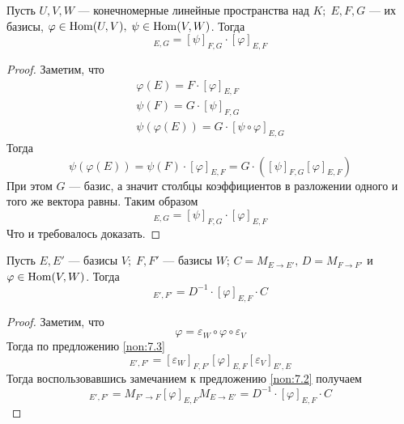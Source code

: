 \documentclass[../main.tex]{subfiles}
\begin{document}
\begin{theorem-non}
\label{non:7.3}
  Пусть $U, V, W$ --- конечномерные линейные пространства над $K;\; E, F, G$ --- их базисы, $\varphi \in \operatorname{Hom}(U, V),\; \psi \in \operatorname{Hom}(V, W)$. Тогда
  \begin{equation*}
    [\psi \circ \varphi]_{E, G} = [\psi]_{F, G} \cdot [\varphi]_{E, F}
  \end{equation*}
\end{theorem-non}
\begin{proof}
  Заметим, что
  \begin{equation*}
    \begin{gathered}
      \varphi(E) = F \cdot [\varphi]_{E, F} \\
      \psi(F) = G \cdot [\psi]_{F, G} \\
      \psi(\varphi(E)) = G \cdot [\psi \circ \varphi]_{E, G}
    \end{gathered}
  \end{equation*}
  Тогда
  \begin{equation*}
    \psi(\varphi(E)) = \psi(F) \cdot [\varphi]_{E, F} = G \cdot ([\psi]_{F, G}[\varphi]_{E, F})
  \end{equation*}
  При этом $G$ --- базис, а значит столбцы коэффициентов в разложении одного и того же вектора равны. Таким образом
  \begin{equation*}
    [\psi \circ \varphi]_{E, G} = [\psi]_{F, G} \cdot [\varphi]_{E, F}
  \end{equation*}
  Что и требовалось доказать.
\end{proof}

\begin{corollary*}
  Пусть $E, E'$ --- базисы $V;\; F, F'$ --- базисы $W$; $C = M_{E\to E'},\, D = M_{F\to F'}$ и $\varphi \in \operatorname{Hom}(V, W)$. Тогда
  \begin{equation*}
    [\varphi]_{E', F'} = D^{-1} \cdot [\varphi]_{E, F} \cdot C
  \end{equation*}
\end{corollary*}
\begin{proof}
  Заметим, что
  \begin{equation*}
    \varphi = \varepsilon_W \circ \varphi \circ \varepsilon_V
  \end{equation*}
  Тогда по предложению \ref{non:7.3}
  \begin{equation*}
    [\varphi]_{E', F'} = [\varepsilon_W]_{F, F'} [\varphi]_{E, F} [\varepsilon_V]_{E', E}
  \end{equation*}
  Тогда воспользовавшись замечанием к предложению \ref{non:7.2} получаем
  \begin{equation*}
    [\varphi]_{E', F'} = M_{F'\to F} [\varphi]_{E, F} M_{E\to E'} = D^{-1} \cdot [\varphi]_{E, F} \cdot C
  \end{equation*}
\end{proof}
\end{document}
